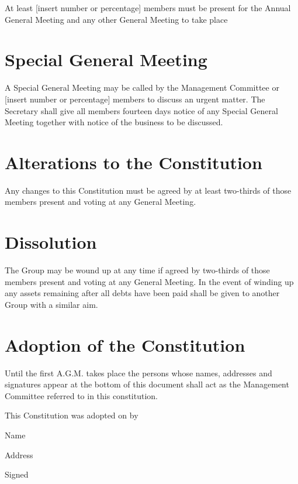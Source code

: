 \documentclass[a4paper, 12pt]{report}
\begin{document}
At least [insert number or percentage] members must be present for the Annual General Meeting and any other General Meeting to take place



\section{Special General Meeting}

A Special General Meeting may be called by the Management Committee or [insert number or percentage] members to discuss an urgent matter. The Secretary shall give all members fourteen days notice of any Special General Meeting together with notice of the business to be discussed.

 
\section{Alterations to the Constitution}

Any changes to this Constitution must be agreed by at least two-thirds of those members present and voting at any General Meeting.



\section{Dissolution}

The Group may be wound up at any time if agreed by two-thirds of those members present and voting at any General Meeting. In the event of winding up any assets remaining after all debts have been paid shall be given to another Group with a similar aim.



\section{Adoption of the Constitution}

Until the first A.G.M. takes place the persons whose names, addresses and signatures appear at the bottom of this document shall act as the Management Committee referred to in this constitution.


This Constitution was adopted on by


Name

Address


Signed
\end{document}
